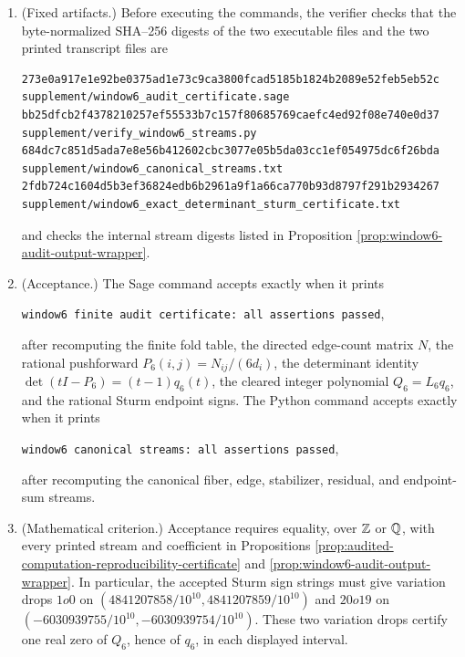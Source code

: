\begin{proposition}
\begin{enumerate}[label=\textup{(\roman*)}]
\[
\texttt{python supplement/verify\_window6\_streams.py}
\]
under Python \(3.10+\).
\item \textup{(Fixed artifacts.)}  Before executing the commands, the verifier checks that the byte-normalized SHA--256 digests of the two executable files and the two printed transcript files are
\begin{center}
\begin{minipage}{0.94\linewidth}
\begin{Verbatim}[breaklines=true,breakanywhere=true,fontsize=\scriptsize]
273e0a917e1e92be0375ad1e73c9ca3800fcad5185b1824b2089e52feb5eb52c  supplement/window6_audit_certificate.sage
bb25dfcb2f4378210257ef55533b7c157f80685769caefc4ed92f08e740e0d37  supplement/verify_window6_streams.py
684dc7c851d5ada7e8e56b412602cbc3077e05b5da03cc1ef054975dc6f26bda  supplement/window6_canonical_streams.txt
2fdb724c1604d5b3ef36824edb6b2961a9f1a66ca770b93d8797f291b2934267  supplement/window6_exact_determinant_sturm_certificate.txt
\end{Verbatim}
\end{minipage}
\end{center}
and checks the internal stream digests listed in Proposition \ref{prop:window6-audit-output-wrapper}.
\item \textup{(Acceptance.)}  The Sage command accepts exactly when it prints
\begin{center}
\texttt{window6 finite audit certificate: all assertions passed},
\end{center}
after recomputing the finite fold table, the directed edge-count matrix \(N\), the rational pushforward \(P_6(i,j)=N_{ij}/(6d_i)\), the determinant identity \(\det(tI-P_6)=(t-1)q_6(t)\), the cleared integer polynomial \(Q_6=L_6q_6\), and the rational Sturm endpoint signs.  The Python command accepts exactly when it prints
\begin{center}
\texttt{window6 canonical streams: all assertions passed},
\end{center}
after recomputing the canonical fiber, edge, stabilizer, residual, and endpoint-sum streams.
\item \textup{(Mathematical criterion.)}  Acceptance requires equality, over \(\mathbb{Z}\) or \(\mathbb{Q}\), with every printed stream and coefficient in Propositions \ref{prop:audited-computation-reproducibility-certificate} and \ref{prop:window6-audit-output-wrapper}.  In particular, the accepted Sturm sign strings must give variation drops \(1	o0\) on \((4841207858/10^{10},4841207859/10^{10})\) and \(20	o19\) on \((-6030939755/10^{10},-6030939754/10^{10})\).  These two variation drops certify one real zero of \(Q_6\), hence of \(q_6\), in each displayed interval.

\end{enumerate}
\end{proposition}
